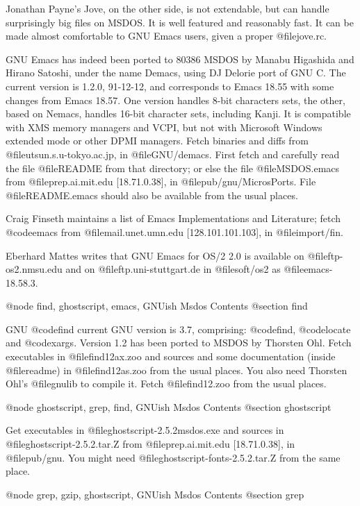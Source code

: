 Jonathan Payne's Jove, on the other side, is not extendable, but can
handle surprisingly big files on MSDOS.  It is well featured and
reasonably fast.  It can be made almost comfortable to GNU Emacs users,
given a proper @file{jove.rc}.

GNU Emacs has indeed been ported to 80386 MSDOS by Manabu Higashida and
Hirano Satoshi, under the name Demacs, using DJ Delorie port of GNU C.
The current version is 1.2.0, 91-12-12, and corresponds to Emacs 18.55
with some changes from Emacs 18.57.  One version handles 8-bit
characters sets, the other, based on Nemacs, handles 16-bit character
sets, including Kanji.  It is compatible with XMS memory managers and
VCPI, but not with Microsoft Windows extended mode or other DPMI
managers.  Fetch binaries and diffs from @file{utsun.s.u-tokyo.ac.jp},
in @file{GNU/demacs}.  First fetch and carefully read the file
@file{README} from that directory; or else the file @file{MSDOS.emacs}
from @file{prep.ai.mit.edu} [18.71.0.38], in @file{pub/gnu/MicrosPorts}.
File @file{README.emacs} should also be available from the usual places.

Craig Finseth maintains a list of Emacs Implementations and Literature;
fetch @code{emacs} from @file{mail.unet.umn.edu} [128.101.101.103], in
@file{import/fin}.

Eberhard Mattes writes that GNU Emacs for OS/2 2.0 is available on
@file{ftp-os2.nmsu.edu} and on @file{ftp.uni-stuttgart.de} in
@file{soft/os2} as @file{emacs-18.58.3}.

@node find, ghostscript, emacs, GNUish Msdos Contents
@section find

GNU @code{find} current GNU version is 3.7, comprising: @code{find},
@code{locate} and @code{xargs}.  Version 1.2 has been ported to MSDOS by
Thorsten Ohl.  Fetch executables in @file{find12ax.zoo} and sources and
some documentation (inside @file{readme}) in @file{find12as.zoo} from
the usual places.  You also need Thorsten Ohl's @file{gnulib} to compile
it.  Fetch @file{find12.zoo} from the usual places.

@node ghostscript, grep, find, GNUish Msdos Contents
@section ghostscript

Get executables in @file{ghostscript-2.5.2msdos.exe} and sources in
@file{ghostscript-2.5.2.tar.Z} from @file{prep.ai.mit.edu} [18.71.0.38],
in @file{pub/gnu}. You might need @file{ghostscript-fonts-2.5.2.tar.Z}
from the same place.

@node grep, gzip, ghostscript, GNUish Msdos Contents
@section grep

